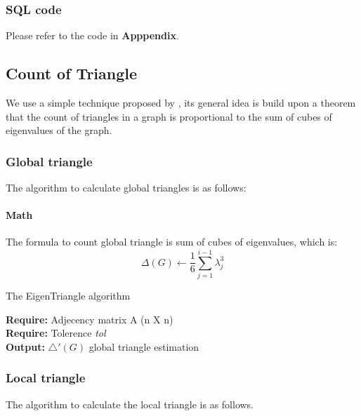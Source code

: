 \subsubsection{SQL code}
Please refer to the code in {\bf Apppendix}.

\subsection{Count of Triangle}
We use a simple technique proposed by \cite{tsourakakis2008fast}, its general idea is build upon a theorem that the count of triangles in a graph is proportional to the sum of cubes of eigenvalues of the graph. 


\subsubsection{Global triangle}
The algorithm to calculate global triangles is as follows:

\paragraph{Math}
The formula to count global triangle is sum of cubes of eigenvalues, which is:
\begin{equation}
    \Delta(G) \gets \frac{1}{6} \sum_{j=1}^{i-1}\lambda_{j}^{3}
\end{equation}

\begin{algorithm}
\caption{The EigenTriangle algorithm}
{\bf Require: } Adjecency matrix A (n X n)\\
{\bf Require: } Tolerence \emph{tol}\\
{\bf Output: } $\bigtriangleup'(G)$ global triangle estimation
\begin{algorithmic}
\STATE{$\overrightarrow{\Lambda} \gets [\lambda_{1}]$}
\REPEAT 
\end{algorithmic}
\end{algorithm}

\subsubsection{Local triangle}
The algorithm to calculate the local triangle is as follows.

